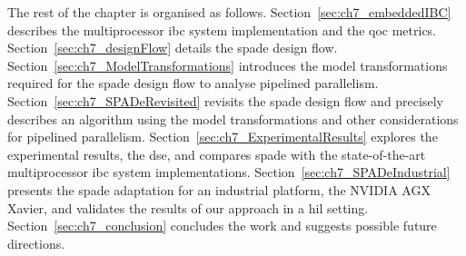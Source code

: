 The rest of the chapter is organised as follows.
Section~\ref{sec:ch7_embeddedIBC} describes the multiprocessor \gls{ibc} system implementation and the \gls{qoc} metrics.
Section~\ref{sec:ch7_designFlow} details the \gls{spade} design flow.
Section~\ref{sec:ch7_ModelTransformations} introduces the model transformations required for the \gls{spade} design flow to analyse pipelined parallelism.
Section~\ref{sec:ch7_SPADeRevisited} revisits the \gls{spade} design flow and precisely describes an algorithm using the model transformations and other considerations for pipelined parallelism.
Section~\ref{sec:ch7_ExperimentalResults} explores the experimental results, the \gls{dse}, and compares \gls{spade} with the state-of-the-art multiprocessor \gls{ibc} system implementations.
Section~\ref{sec:ch7_SPADeIndustrial} presents the \gls{spade} adaptation for an industrial platform, the NVIDIA AGX Xavier, and validates the results of our approach in a \gls{hil} setting.
Section~\ref{sec:ch7_conclusion} concludes the work and suggests possible future directions.